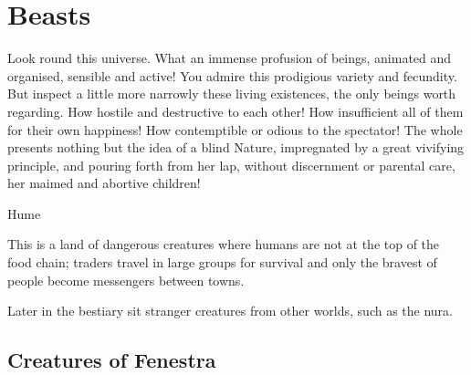 \chapter{Beasts}
\label{bestiary}


\epigraph{Look round this universe. What an immense profusion of beings, animated and organised, sensible and active! You admire this prodigious variety and fecundity. But inspect a little more narrowly these living existences, the only beings worth regarding. How hostile and destructive to each other! How insufficient all of them for their own happiness! How contemptible or odious to the spectator! The whole presents nothing but the idea of a blind Nature, impregnated by a great vivifying principle, and pouring forth from her lap, without discernment or parental care, her maimed and abortive children!}{Hume}


\begin{multicols}{2}

\noindent
This is a land of dangerous creatures where humans are not at the top of the food chain; traders travel in large groups for survival and only the bravest of people become messengers between towns.

Later in the bestiary sit stranger creatures from other worlds, such as the nura.

\end{multicols}

\section[Creatures of Fenestra]{Creatures of Fenestra \A}

